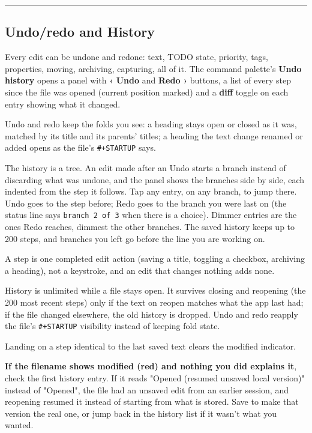 \documentclass[11pt]{article}
\begin{document}
\noindent\rule{\textwidth}{0.5pt}

\subsection{Undo/redo and History}
\label{sec:org82ca105}
Every edit can be undone and redone: text, TODO state, priority, tags, properties, moving, archiving, capturing, all of it. The command palette's \textbf{Undo history} opens a panel with \textbf{‹ Undo} and \textbf{Redo ›} buttons, a list of every step since the file was opened (current position marked) and a \textbf{diff} toggle on each entry showing what it changed.

Undo and redo keep the folds you see: a heading stays open or closed as it was, matched by its title and its parents' titles; a heading the text change renamed or added opens as the file's \texttt{\#+STARTUP} says.

The history is a tree. An edit made after an Undo starts a branch instead of discarding what was undone, and the panel shows the branches side by side, each indented from the step it follows. Tap any entry, on any branch, to jump there. Undo goes to the step before; Redo goes to the branch you were last on (the status line says \texttt{branch 2 of 3} when there is a choice). Dimmer entries are the ones Redo reaches, dimmest the other branches. The saved history keeps up to 200 steps, and branches you left go before the line you are working on.

A step is one completed edit action (saving a title, toggling a checkbox, archiving a heading), not a keystroke, and an edit that changes nothing adds none.

History is unlimited while a file stays open. It survives closing and reopening (the 200 most recent steps) only if the text on reopen matches what the app last had; if the file changed elsewhere, the old history is dropped. Undo and redo reapply the file's \texttt{\#+STARTUP} visibility instead of keeping fold state.

Landing on a step identical to the last saved text clears the modified indicator.

\textbf{If the filename shows modified (red) and nothing you did explains it}, check the first history entry. If it reads "Opened (resumed unsaved local version)" instead of "Opened", the file had an unsaved edit from an earlier session, and reopening resumed it instead of starting from what is stored. Save to make that version the real one, or jump back in the history list if it wasn't what you wanted.
\end{document}
